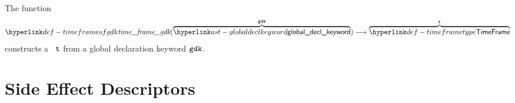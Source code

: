 \hypertarget{def-timeframeofgdk}{}
The function
\[
    \timeframeofgdk(\overname{\globaldeclkeyword}{\gdk}) \aslto \overname{\TTimeFrame}{\vt}
\]
constructs a \timeframeterm\ $\vt$ from a global declaration keyword $\gdk$.

\ProseParagraph
{}

\FormallyParagraph
\begin{mathpar}
\end{mathpar}

\section{Side Effect Descriptors\label{sec:SideEffectDescriptors}}

